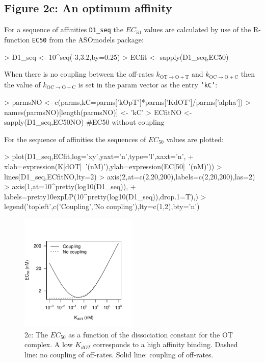 \documentclass{article}
\newenvironment{Ncenter}{%
  \setlength\topsep{-10pt}
  \setlength\parskip{-100pt}
  \begin{center}
}{%
  \end{center}
}
\newcommand{\kmo}{k_{\mathrm{OT \to O+T}}}
\newcommand{\kD}{k_{\mathrm{OC \to O+C}}}
\begin{document}
\subsection*{Figure 2c: An optimum affinity}
For a sequence of affinities \texttt{D1\_seq} the $EC_{50}$ values are calculated by use of the R-function \texttt{EC50} from the ASOmodels package:
\begin{Schunk}
\begin{Sinput}
> D1_seq <- 10^seq(-3,3.2,by=0.25)
> ECfit <- sapply(D1_seq,EC50)
\end{Sinput}
\end{Schunk}
When there is no coupling between the off-rates $\kmo$ and $\kD$ then the value of $\kD$ is set in the param vector as the entry \texttt{'kC'}:
\begin{Schunk}
\begin{Sinput}
> parmsNO <- c(parms,kC=parms['kOpT']*parms['KdOT']/parms['alpha'])
> names(parmsNO)[length(parmsNO)] <- 'kC'
> ECfitNO <- sapply(D1_seq,EC50NO) #EC50 without coupling
\end{Sinput}
\end{Schunk}
For the sequence of affinities the sequences of $EC_{50}$ values are plotted:
\begin{Schunk}
\begin{Sinput}
> plot(D1_seq,ECfit,log='xy',yaxt='n',type='l',xaxt='n',
+      xlab=expression(K[dOT]~'(nM)'),ylab=expression(EC[50]~'(nM)'))
> lines(D1_seq,ECfitNO,lty=2)
> axis(2,at=c(2,20,200),labels=c(2,20,200),las=2)
> axis(1,at=10^pretty(log10(D1_seq)),
+      labels=pretty10expLP(10^pretty(log10(D1_seq)),drop.1=T),)
> legend('topleft',c('Coupling','No coupling'),lty=c(1,2),bty='n')
\end{Sinput}
\end{Schunk}
\begin{figure}[!h]
\begin{Ncenter}
\includegraphics[width=0.5\textwidth]{Vignette2-Fig3}
\end{Ncenter}
\caption{2c: The $EC_{50}$ as a function of the dissociation constant for the OT complex. A low $K_{dOT}$ corresponds to a high affinity binding. Dashed line: no coupling of off-rates. Solid line: coupling of off-rates.}
\end{figure}
\end{document}

